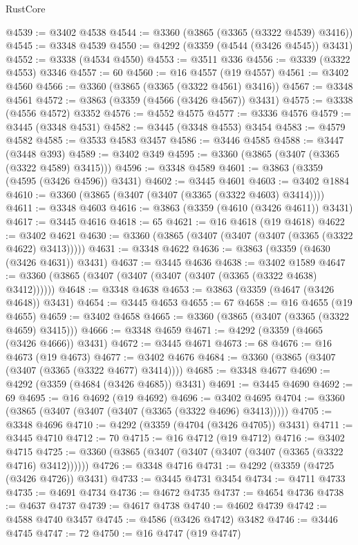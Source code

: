 \begin{lexlean}{RustCore}
\begin{coremodule}
@4539 := @3402 @4538
@4544 := @3360 (@3865 (@3365 (@3322 @4539) @3416))
@4545 := @3348 @4539
@4550 := @4292 (@3359 (@4544 (@3426 @4545)) @3431)
@4552 := @3338 (@4534 @4550)
@4553 := @3511 @336
@4556 := @3339 (@3322 @4553) @3346
@4557 := 60
@4560 := @16 @4557 (@19 @4557)
@4561 := @3402 @4560
@4566 := @3360 (@3865 (@3365 (@3322 @4561) @3416))
@4567 := @3348 @4561
@4572 := @3863 (@3359 (@4566 (@3426 @4567)) @3431)
@4575 := @3338 (@4556 @4572) @3352
@4576 := @4552 @4575
@4577 := @3336 @4576
@4579 := @3445 (@3348 @4531)
@4582 := @3445 (@3348 @4553) @3454
@4583 := @4579 @4582
@4585 := @3533 @4583 @3457
@4586 := @3446 @4585
@4588 := @3447 (@3448 @393)
@4589 := @3402 @349
@4595 := @3360 (@3865 (@3407 (@3365 (@3322 @4589) @3415)))
@4596 := @3348 @4589
@4601 := @3863 (@3359 (@4595 (@3426 @4596)) @3431)
@4602 := @3445 @4601
@4603 := @3402 @1884
@4610 := @3360 (@3865 (@3407 (@3407 (@3365 (@3322 @4603) @3414))))
@4611 := @3348 @4603
@4616 := @3863 (@3359 (@4610 (@3426 @4611)) @3431)
@4617 := @3445 @4616
@4618 := 65
@4621 := @16 @4618 (@19 @4618)
@4622 := @3402 @4621
@4630 := @3360 (@3865 (@3407 (@3407 (@3407 (@3365 (@3322 @4622) @3413)))))
@4631 := @3348 @4622
@4636 := @3863 (@3359 (@4630 (@3426 @4631)) @3431)
@4637 := @3445 @4636
@4638 := @3402 @1589
@4647 := @3360 (@3865 (@3407 (@3407 (@3407 (@3407 (@3365 (@3322 @4638) @3412))))))
@4648 := @3348 @4638
@4653 := @3863 (@3359 (@4647 (@3426 @4648)) @3431)
@4654 := @3445 @4653
@4655 := 67
@4658 := @16 @4655 (@19 @4655)
@4659 := @3402 @4658
@4665 := @3360 (@3865 (@3407 (@3365 (@3322 @4659) @3415)))
@4666 := @3348 @4659
@4671 := @4292 (@3359 (@4665 (@3426 @4666)) @3431)
@4672 := @3445 @4671
@4673 := 68
@4676 := @16 @4673 (@19 @4673)
@4677 := @3402 @4676
@4684 := @3360 (@3865 (@3407 (@3407 (@3365 (@3322 @4677) @3414))))
@4685 := @3348 @4677
@4690 := @4292 (@3359 (@4684 (@3426 @4685)) @3431)
@4691 := @3445 @4690
@4692 := 69
@4695 := @16 @4692 (@19 @4692)
@4696 := @3402 @4695
@4704 := @3360 (@3865 (@3407 (@3407 (@3407 (@3365 (@3322 @4696) @3413)))))
@4705 := @3348 @4696
@4710 := @4292 (@3359 (@4704 (@3426 @4705)) @3431)
@4711 := @3445 @4710
@4712 := 70
@4715 := @16 @4712 (@19 @4712)
@4716 := @3402 @4715
@4725 := @3360 (@3865 (@3407 (@3407 (@3407 (@3407 (@3365 (@3322 @4716) @3412))))))
@4726 := @3348 @4716
@4731 := @4292 (@3359 (@4725 (@3426 @4726)) @3431)
@4733 := @3445 @4731 @3454
@4734 := @4711 @4733
@4735 := @4691 @4734
@4736 := @4672 @4735
@4737 := @4654 @4736
@4738 := @4637 @4737
@4739 := @4617 @4738
@4740 := @4602 @4739
@4742 := @4588 @4740 @3457
@4745 := @4586 (@3426 @4742) @3482
@4746 := @3446 @4745
@4747 := 72
@4750 := @16 @4747 (@19 @4747)

\end{coremodule}
\end{lexlean}
